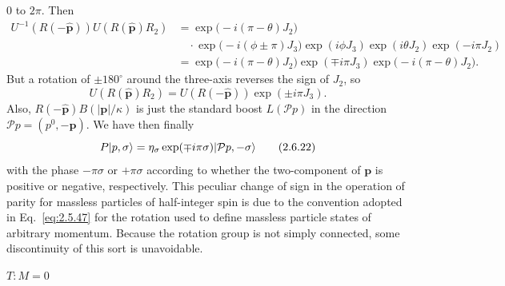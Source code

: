 $0$ to $2\pi$. Then
\[
\begin{aligned}
U^{-1}(R(-\hat{\mathbf{p}}))U(R(\hat{\mathbf{p}})R_2)
&=\exp\bigl(-i(\pi-\theta)J_2\bigr)\\
&\quad\cdot\exp\bigl(-i(\phi\pm\pi)J_3\bigr)
\exp(i\phi J_3)\exp(i\theta J_2)\exp(-i\pi J_2)\\
&=\exp\bigl(-i(\pi-\theta)J_2\bigr)
\exp(\mp i\pi J_3)
\exp\bigl(-i(\pi-\theta)J_2\bigr).
\end{aligned}
\]
But a rotation of $\pm180^\circ$ around the three-axis reverses the sign of
$J_2$, so
\begin{equation}
U(R(\hat{\mathbf{p}})R_2)
=U(R(-\hat{\mathbf{p}}))\exp(\pm i\pi J_3).
\tag{2.6.21}\label{eq:2.6.21}
\end{equation}
Also, $R(-\hat{\mathbf{p}})B(|\mathbf{p}|/\kappa)$ is just the standard boost
$L(\mathcal{P}p)$ in the direction $\mathcal{P}p=(p^0,-\mathbf{p})$. We have
then finally
\begin{equation}
P\lvert p,\sigma\rangle
=\eta_\sigma\exp(\mp i\pi\sigma)\lvert \mathcal{P}p,-\sigma\rangle
\tag{2.6.22}\label{eq:2.6.22}
\end{equation}
with the phase $-\pi\sigma$ or $+\pi\sigma$ according to whether the
two-component of $\mathbf{p}$ is positive or negative, respectively. This
peculiar change of sign in the operation of parity for massless particles of
half-integer spin is due to the convention adopted in Eq.~\eqref{eq:2.5.47} for the
rotation used to define massless particle states of arbitrary momentum.
Because the rotation group is not simply connected, some discontinuity of
this sort is unavoidable.

\medskip
\noindent\textbf{$T:M=0$}

